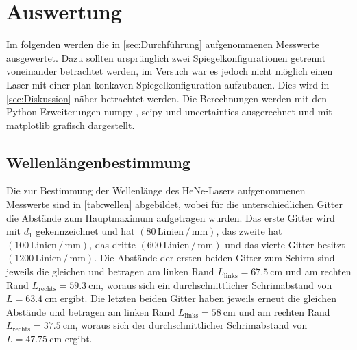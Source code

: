 \section{Auswertung}
\label{sec:Auswertung}
Im folgenden werden die in \autoref{sec:Durchführung} aufgenommenen Messwerte ausgewertet. Dazu sollten ursprünglich zwei Spiegelkonfigurationen getrennt
voneinander betrachtet werden, im Versuch war es jedoch nicht möglich einen Laser mit einer plan-konkaven Spiegelkonfiguration aufzubauen. Dies wird in \autoref{sec:Diskussion} näher betrachtet werden.
Die Berechnungen werden mit den Python-Erweiterungen numpy \cite{numpy}, scipy \cite{scipy} und uncertainties \cite{uncertainties} ausgerechnet und mit matplotlib \cite{matplotlib} grafisch dargestellt.

\subsection{Wellenlängenbestimmung}
\label{subsec:wellen}

Die zur Bestimmung der Wellenlänge des HeNe-Lasers aufgenommenen Messwerte sind in \autoref{tab:wellen} abgebildet, wobei für die unterschiedlichen Gitter die Abstände zum Hauptmaximum aufgetragen wurden.
Das erste Gitter wird mit $d_1$ gekennzeichnet und hat $(80\, \text{Linien}\,/\,\si{\milli\meter})$, das zweite hat $(100\, \text{Linien}\,/\,\si{\milli\meter})$, das dritte $(600\, \text{Linien}\,/\,\si{\milli\meter})$ und das
vierte Gitter besitzt $(1200\, \text{Linien}\,/\,\si{\milli\meter})$.
Die Abstände der ersten beiden Gitter zum Schirm sind jeweils die gleichen und betragen am linken Rand $L_\text{links}=\SI{67.5}{\centi\meter}$ und am rechten Rand $L_{\text{rechts}}=\SI{59.3}{\centi\meter}$, woraus sich ein
durchschnittlicher Schrimabstand von $L=\SI{63.4}{\centi\meter}$ ergibt.
Die letzten beiden Gitter haben jeweils erneut die gleichen Abstände und betragen am linken Rand $L_\text{links}=\SI{58}{\centi\meter}$ und am rechten Rand $L_{\text{rechts}}=\SI{37.5}{\centi\meter}$, woraus sich der
durchschnittlicher Schrimabstand von $L=\SI{47.75}{\centi\meter}$ ergibt.



